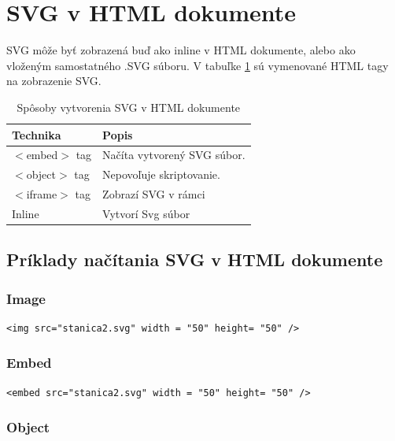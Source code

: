  
 \section{\acs*{SVG} v HTML dokumente}

SVG môže byť zobrazená buď ako inline v HTML dokumente, alebo ako vloženým samostatného .SVG súboru. 
V tabuľke \ref{vytvorenie:SVG} sú vymenované HTML tagy na zobrazenie SVG. 



\begin{table}[hp]
	\begin{center}
		\begin{tabular}{|l|l|}
			\hline \textbf{Technika} & \textbf{Popis} \\ 
			\hline $<$embed$>$ tag & Načíta vytvorený SVG súbor.  \\ 
			\hline $<$object$>$ tag & Nepovoľuje skriptovanie.  \\ 
			\hline $<$iframe$>$ tag & Zobrazí SVG v rámci  \\ 
			\hline Inline & Vytvorí Svg súbor \\ 
			\hline
		\end{tabular} 
	\end{center}
	\caption{Spôsoby vytvorenia SVG v HTML dokumente}
	\label{vytvorenie:SVG}
\end{table}

\subsection{Príklady načítania SVG v HTML dokumente}

	\subsubsection{Image}
	\begin{lstlisting}
<img src="stanica2.svg" width = "50" height= "50" />
	\end{lstlisting}
	
	\subsubsection{Embed}
	\begin{lstlisting}
<embed src="stanica2.svg" width = "50" height= "50" />
	\end{lstlisting}
	
	
\subsubsection{Object}

